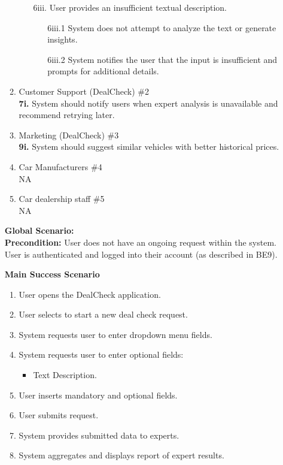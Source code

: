 \documentclass[]{article}
\begin{document}
\begin{enumerate}[{\bf {BE}1.}]
\begin{enumerate}[{\bf VP1.}]
\begin{enumerate}
			\item [6iii.] User provides an insufficient textual description.
			\begin{enumerate}
				\item [6iii.1] System does not attempt to analyze the text or generate insights.
				\item [6iii.2] System notifies the user that the input is insufficient and prompts for additional details.
			\end{enumerate}
		\end{enumerate}
    
        \item Customer Support (DealCheck) \#2 \\
            \textbf{7i.} System should notify users when expert analysis is unavailable and recommend retrying later.
        \item Marketing (DealCheck) \#3 \\
            \textbf{9i.} System should suggest similar vehicles with better historical prices.
        \item Car Manufacturers \#4 \\
            NA
        \item Car dealership staff \#5 \\
            NA
    \end{enumerate}
    {\bf Global Scenario:}\\
    {\bf Precondition:} User does not have an ongoing request within the system. User is authenticated and logged into their account (as described in BE9).
    
    {\bf Main Success Scenario}
        \begin{enumerate}[1.]
            \item User opens the DealCheck application.
            \item User selects to start a new deal check request.
            \item System requests user to enter dropdown menu fields.
            \item System requests user to enter optional fields:
            \begin{itemize}
                \item Text Description.
            \end{itemize}
            \item User inserts mandatory and optional fields.
            \item User submits request.
            \item System provides submitted data to experts.
            \item System aggregates and displays report of expert results.
        \end{enumerate}
        

\end{enumerate}
\end{document}

